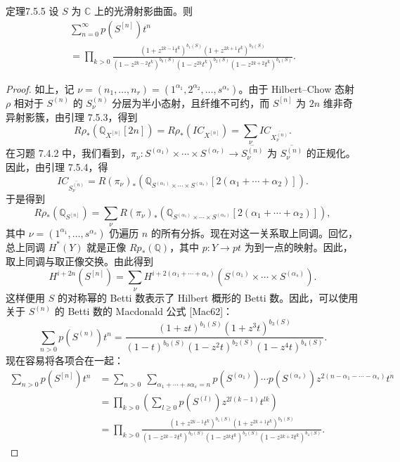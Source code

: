 \begin{origstatement}{定理}{7.5.5}\label{ch07:7.5.5}
设 $S$ 为 $\mathbb C$ 上的光滑射影曲面。则
\[
\begin{gathered}
\sum_{n=0}^\infty p(S^{[n]})t^n\\
=\prod_{k>0}
\frac{(1+z^{2k-1}t^k)^{b_1(S)}(1+z^{2k+1}t^k)^{b_3(S)}}
{(1-z^{2k-2}t^k)^{b_0(S)}(1-z^{2k}t^k)^{b_2(S)}(1-z^{2k+2}t^k)^{b_4(S)}}.
\end{gathered}
\]
\end{origstatement}
\begin{proof}
如上，记 $\nu=(n_1,\ldots,n_r)=(1^{\alpha_1},2^{\alpha_2},\ldots,s^{\alpha_s})$。由于 Hilbert--Chow 态射 $\rho$ 相对于 $S^{(n)}$ 的 $S_\nu^{(n)}$ 分层为半小态射，且纤维不可约，而 $S^{[n]}$ 为 $2n$ 维非奇异射影簇，由引理 7.5.3，得到
\[
R\rho_*(\mathbb Q_{X^{[n]}}[2n])
=R\rho_*(IC_{X^{[n]}})=\sum_\nu IC_{\overline{X_\nu^{(n)}}}.
\]
在习题 7.4.2 中，我们看到，$\pi_\nu:S^{(\alpha_1)}\times\cdots\times S^{(\alpha_r)}\to\overline{S_\nu^{(n)}}$ 为 $\overline{S_\nu^{(n)}}$ 的正规化。因此，由引理 7.5.4，得
\[
IC_{\overline{S_\nu^{(n)}}}
=R(\pi_\nu)_*\left(\mathbb Q_{S^{(\alpha_1)}\times\cdots\times S^{(\alpha_s)}}
[2(\alpha_1+\cdots+\alpha_2)]\right).
\]
于是得到
\[
R\rho_*(\mathbb Q_{S^{[n]}})
=\sum_\nu R(\pi_\nu)_*\left(\mathbb Q_{S^{(\alpha_1)}\times\cdots\times S^{(\alpha_s)}}
[2(\alpha_1+\cdots+\alpha_2)]\right),
\]
其中 $\nu=(1^{\alpha_1},\ldots,s^{\alpha_s})$ 仍遍历 $n$ 的所有分拆。现在对这一关系取上同调。回忆，总上同调 $H^*(Y)$ 就是正像 $Rp_*(\mathbb Q)$，其中 $p:Y\to pt$ 为到一点的映射。因此，取上同调与取正像交换。由此得到
\[
H^{i+2n}(S^{[n]})
=\sum_\nu H^{i+2(\alpha_1+\cdots+\alpha_s)}
(S^{(\alpha_1)}\times\cdots\times S^{(\alpha_s)}).
\]
这样便用 $S$ 的对称幂的 Betti 数表示了 Hilbert 概形的 Betti 数。因此，可以使用关于 $S^{(n)}$ 的 Betti 数的 Macdonald 公式 [Mac62]：
\[
\sum_{n>0}p(S^{(n)})t^n
=\frac{(1+zt)^{b_1(S)}(1+z^3t)^{b_3(S)}}
{(1-t)^{b_0(S)}(1-z^2t)^{b_2(S)}(1-z^4t)^{b_4(S)}}.
\]
现在容易将各项合在一起：
\[
\begin{aligned}
\sum_{n>0}p(S^{[n]})t^n
&=\sum_{n>0}\ \sum_{\alpha_1+\cdots+s\alpha_s=n}
 p(S^{(\alpha_1)})\cdots p(S^{(\alpha_s)})
 z^{2(n-\alpha_1-\cdots-\alpha_s)}t^n\\
&=\prod_{k>0}\left(\sum_{l\geq0}p(S^{(l)})z^{2l(k-1)}t^{lk}\right)\\
&=\prod_{k>0}
\frac{(1+z^{2k-1}t^k)^{b_1(S)}(1+z^{2k+1}t^k)^{b_3(S)}}
{(1-z^{2k-2}t^k)^{b_0(S)}(1-z^{2k}t^k)^{b_2(S)}(1-z^{2k+2}t^k)^{b_4(S)}}.
\end{aligned}
\]
\end{proof}
